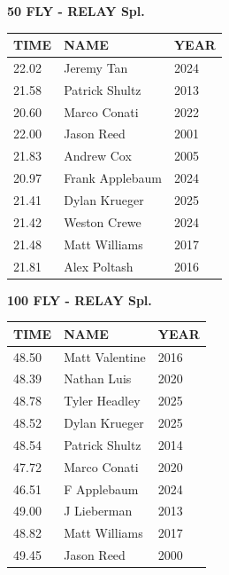 \begin{table}[H]
\centering
\begin{minipage}[t]{0.6\textwidth}
\centering
\textbf{50 FLY - RELAY Spl.}\\[0.1cm]
\begin{tabular}{@{}p{1.8cm}p{2.8cm}p{1.2cm}@{}}
\hline
    \textbf{TIME} & \textbf{NAME} & \textbf{YEAR} \\
\hline
    22.02 & Jeremy Tan & 2024 \\
    21.58 & Patrick Shultz & 2013 \\
    20.60 & Marco Conati & 2022 \\
    22.00 & Jason Reed & 2001 \\
    21.83 & Andrew Cox & 2005 \\
    20.97 & Frank Applebaum & 2024 \\
    21.41 & Dylan Krueger & 2025 \\
    21.42 & Weston Crewe & 2024 \\
    21.48 & Matt Williams & 2017 \\
    21.81 & Alex Poltash & 2016 \\
\hline
\end{tabular}
\end{minipage}
\end{table}

\begin{table}[H]
\centering
\begin{minipage}[t]{0.6\textwidth}
\centering
\textbf{100 FLY - RELAY Spl.}\\[0.1cm]
\begin{tabular}{@{}p{1.8cm}p{2.8cm}p{1.2cm}@{}}
\hline
    \textbf{TIME} & \textbf{NAME} & \textbf{YEAR} \\
\hline
    48.50 & Matt Valentine & 2016 \\
    48.39 & Nathan Luis & 2020 \\
    48.78 & Tyler Headley & 2025 \\
    48.52 & Dylan Krueger & 2025 \\
    48.54 & Patrick Shultz & 2014 \\
    47.72 & Marco Conati & 2020 \\
    46.51 & F Applebaum & 2024 \\
    49.00 & J Lieberman & 2013 \\
    48.82 & Matt Williams & 2017 \\
    49.45 & Jason Reed & 2000 \\
\hline
\end{tabular}
\end{minipage}
\end{table}

